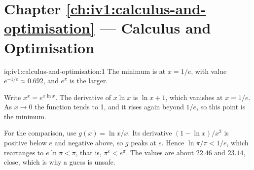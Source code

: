 \section*{Chapter \ref{ch:iv1:calculus-and-optimisation} --- Calculus and Optimisation}

\begin{solution}{iq:iv1:calculus-and-optimisation:1}
The minimum is at $x = 1/e$, with value $e^{-1/e} \approx 0.692$, and $e^\pi$ is the larger.

Write $x^x = e^{x\ln x}$. The derivative of $x\ln x$ is $\ln x + 1$, which vanishes at $x = 1/e$. As $x \to 0$ the function tends to 1, and it rises again beyond $1/e$, so this point is the minimum.

For the comparison, use $g(x) = \ln x / x$. Its derivative $(1 - \ln x)/x^2$ is positive below $e$ and negative above, so $g$ peaks at $e$. Hence $\ln\pi/\pi < 1/e$, which rearranges to $e\ln\pi < \pi$, that is, $\pi^e < e^\pi$. The values are about $22.46$ and $23.14$, close, which is why a guess is unsafe.



\end{solution}

